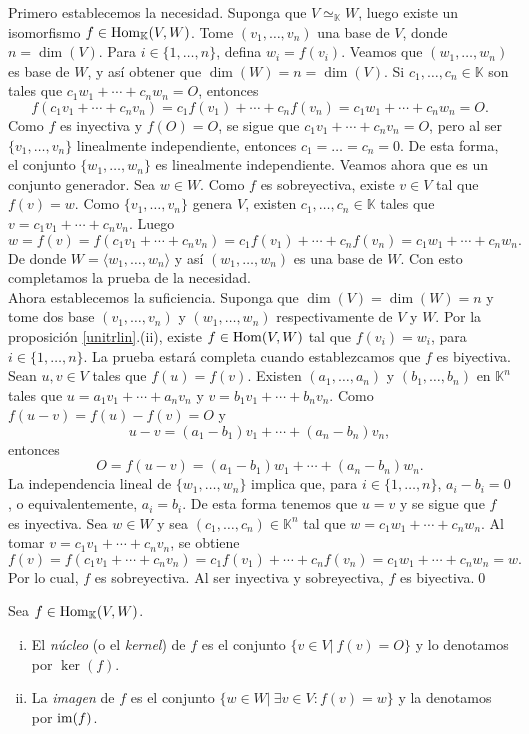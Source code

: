 \dem Primero establecemos la necesidad. Suponga que $V\simeq_{\mathbb{K}} W$, luego existe un isomorfismo $f\in\operatorname{Hom}_{\mathbb{K}}(V,W)$. Tome $(v_1,\ldots,v_n)$ una base de $V$, donde $n=\dim(V)$. Para $i\in\{1,\ldots,n\}$, defina $w_i=f(v_i)$. Veamos que $(w_1,\ldots,w_n)$ es base de $W$, y así obtener que $\dim(W)=n=\dim(V)$. Si $c_1,\ldots,c_n\in \mathbb{K}$ son tales que $c_1w_1+\cdots+c_nw_n=O$, entonces
\[
f(c_1v_1+\cdots+c_nv_n)=c_1f(v_1)+\cdots+c_nf(v_n)=c_1w_1+\cdots+c_nw_n=O.
\]
Como $f$ es inyectiva y $f(O)=O$, se sigue que $c_1v_1+\cdots+c_nv_n=O$, pero al ser $\{v_1,\ldots,v_n\}$ linealmente independiente, entonces $c_1=\ldots=c_n=0$. De esta forma, el conjunto $\{w_1,\ldots,w_n\}$ es linealmente independiente. Veamos ahora que es un conjunto generador. Sea $w\in W$. Como $f$ es sobreyectiva, existe $v\in V$ tal que $f(v)=w$. Como $\{v_1,\ldots,v_n\}$ genera $V$, existen $c_1,\ldots,c_n\in \mathbb{K}$ tales que $v=c_1v_1+\cdots+c_nv_n$. Luego
\[
w=f(v)=f(c_1v_1+\cdots+c_nv_n)=c_1f(v_1)+\cdots+c_nf(v_n)=c_1w_1+\cdots+c_nw_n.
\]
De donde $W=\langle w_1,\ldots,w_n\rangle$ y as\'i $(w_1,\ldots,w_n)$ es una base de $W$. Con esto completamos la prueba de la necesidad.\\
Ahora establecemos la suficiencia. Suponga que $\dim(V)=\dim(W)=n$ y tome dos base $(v_1,\ldots,v_n)$ y $(w_1,\ldots,w_n)$ respectivamente de $V$ y $W$. Por la proposici\'on \ref{unitrlin}.(ii), existe $f\in\operatorname{Hom}(V,W)$ tal que $f(v_i)=w_i$, para $i\in\{1,\ldots,n\}$. La prueba estar\'a completa cuando establezcamos que $f$ es biyectiva. Sean $u,v\in V$ tales que $f(u)=f(v)$. Existen $(a_1,\ldots,a_n)$ y $(b_1,\ldots,b_n)$ en $\mathbb{K}^n$ tales que $u=a_1v_1+\cdots+a_nv_n$ y $v=b_1v_1+\cdots+b_nv_n$. Como $f(u-v)=f(u)-f(v)=O$ y
\[
u-v=(a_1-b_1)v_1+\cdots+(a_n-b_n)v_n,
\]
entonces
\[
O=f(u-v)=(a_1-b_1)w_1+\cdots+(a_n-b_n)w_n.
\]
La independencia lineal de $\{w_1,\ldots,w_n\}$ implica que, para $i\in\{1,\ldots,n\}$, $a_i-b_i=0$, o equivalentemente, $a_i=b_i$. De esta forma tenemos que $u=v$ y se sigue que $f$ es inyectiva. Sea $w\in W$ y sea $(c_1,\ldots, c_n)\in \mathbb{K}^n$ tal que $w=c_1w_1+\cdots+c_nw_n$. Al tomar $v=c_1v_1+\cdots+c_nv_n$, se obtiene
\[
f(v)=f(c_1v_1+\cdots+c_nv_n)=c_1f(v_1)+\cdots+c_nf(v_n)=c_1w_1+\cdots+c_nw_n=w.
\]
Por lo cual, $f$ es sobreyectiva. Al ser inyectiva y sobreyectiva, $f$ es biyectiva.\qed

\begin{defn}
Sea $f\in\operatorname{Hom}_{\mathbb{K}}(V,W)$.
\begin{enumerate}[(i)]
\item El \emph{n\'ucleo} (o el \emph{kernel}) de $f$ es el conjunto $\{v\in V|\ f(v)=O\}$ y lo denotamos por $\ker(f)$.
\item La \emph{imagen} de $f$ es el conjunto $\{w\in W|\ \exists v\in V: f(v)=w\}$ y la denotamos por
$\operatorname{im}(f)$.
\end{enumerate}
\end{defn}

